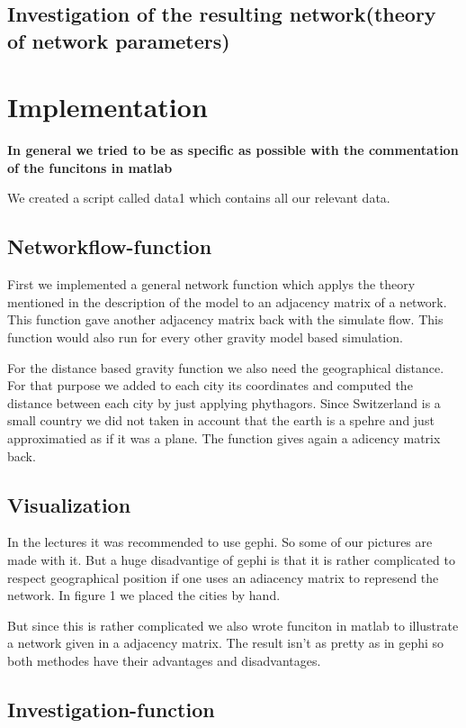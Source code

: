 \documentclass[11pt]{article}
\begin{document}
\subsection{Investigation of the resulting network(theory of network parameters)}



\section{Implementation}
\textbf{In general we tried to be as specific as possible with the commentation of the funcitons in matlab}

We created a script called data1 which contains all our relevant data.

\subsection{Networkflow-function}
First we implemented a general network function which applys the theory mentioned in the description of the model to an adjacency matrix of a network. This function gave another adjacency matrix back with the simulate flow. This function would also run for every other gravity model based simulation.\newline

For the distance based gravity function we also need the geographical distance. For that purpose we added to each city its coordinates and computed the distance between each city by just applying phythagors. Since Switzerland is a small country we did not taken in account that the earth is a spehre and just approximatied as if it was a plane. The function gives again a adicency matrix back.


\subsection{Visualization}
In the lectures it was recommended to use gephi. So some of our pictures are made with it. But a huge disadvantige of gephi is that it is rather complicated to respect geographical position if one uses an adiacency  matrix to represend the network. In figure 1 we placed the cities by hand.

But since this is rather complicated we also wrote funciton in matlab to illustrate a network given in a adjacency matrix. The result isn't as pretty as in gephi so both methodes have their advantages and disadvantages.

\subsection{Investigation-function}
\end{document}
